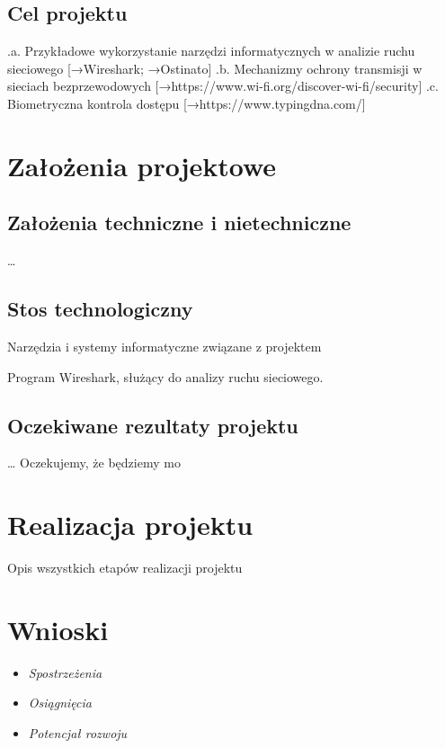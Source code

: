 \documentclass[12pt,a4paper]{article}
\begin{document}
\subsection{Cel projektu}
.a. Przykładowe wykorzystanie narzędzi informatycznych w analizie ruchu sieciowego [→Wireshark; →Ostinato]
.b. Mechanizmy ochrony transmisji w sieciach bezprzewodowych [→https://www.wi-fi.org/discover-wi-fi/security]
.c. Biometryczna kontrola dostępu [→https://www.typingdna.com/]

\newpage

\section{Założenia projektowe}

\subsection{Założenia techniczne i nietechniczne}
\ldots 

\subsection{Stos technologiczny}
Narzędzia i systemy informatyczne związane z projektem

Program Wireshark, służący do analizy ruchu sieciowego.

\subsection{Oczekiwane rezultaty projektu}
\ldots 
Oczekujemy, że będziemy mo
\newpage
\section{Realizacja projektu}
Opis wszystkich etapów realizacji projektu

\newpage
\section{Wnioski}

\begin{itemize}
\item \textit{Spostrzeżenia}
\item \textit{Osiągnięcia}
\item \textit{Potencjał rozwoju}
\end{itemize}
\end{document}
